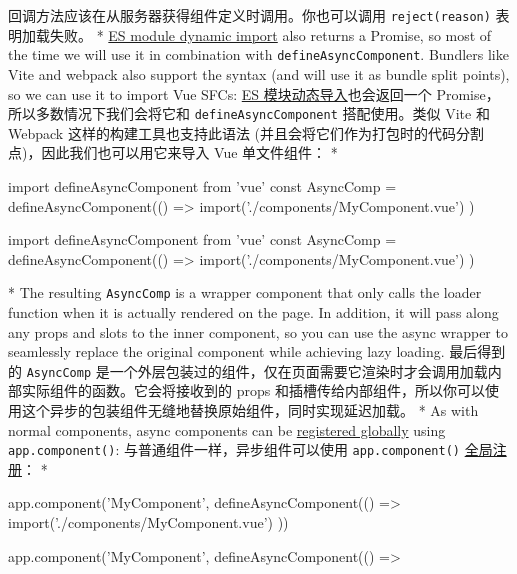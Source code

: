 \begin{paracol}{2}
回调方法应该在从服务器获得组件定义时调用。你也可以调用
\texttt{reject(reason)} 表明加载失败。
\switchcolumn[0]*%
\href{https://developer.mozilla.org/en-US/docs/Web/JavaScript/Reference/Operators/import}{ES
module dynamic import} also returns a Promise, so most of the time we
will use it in combination with \texttt{defineAsyncComponent}. Bundlers
like Vite and webpack also support the syntax (and will use it as bundle
split points), so we can use it to import Vue SFCs:
\switchcolumn
\href{https://developer.mozilla.org/en-US/docs/Web/JavaScript/Reference/Operators/import}{ES
模块动态导入}也会返回一个 Promise，所以多数情况下我们会将它和
\texttt{defineAsyncComponent} 搭配使用。类似 Vite 和 Webpack
这样的构建工具也支持此语法
(并且会将它们作为打包时的代码分割点)，因此我们也可以用它来导入 Vue
单文件组件：
\switchcolumn[0]*%
\begin{codeJs}
import { defineAsyncComponent } from 'vue'
const AsyncComp = defineAsyncComponent(() =>
  import('./components/MyComponent.vue')
)
\end{codeJs}
\switchcolumn
\begin{codeJs}
import { defineAsyncComponent } from 'vue'
const AsyncComp = defineAsyncComponent(() =>
  import('./components/MyComponent.vue')
)
\end{codeJs}
\switchcolumn[0]*%
The resulting \texttt{AsyncComp} is a wrapper component that only calls
the loader function when it is actually rendered on the page. In
addition, it will pass along any props and slots to the inner component,
so you can use the async wrapper to seamlessly replace the original
component while achieving lazy loading.
\switchcolumn
最后得到的 \texttt{AsyncComp}
是一个外层包装过的组件，仅在页面需要它渲染时才会调用加载内部实际组件的函数。它会将接收到的
props
和插槽传给内部组件，所以你可以使用这个异步的包装组件无缝地替换原始组件，同时实现延迟加载。
\switchcolumn[0]*%
As with normal components, async components can be
\href{https://vuejs.org/guide/components/registration.html\#global-registration}{registered
globally} using \texttt{app.component()}:
\switchcolumn
与普通组件一样，异步组件可以使用 \texttt{app.component()}
\href{https://cn.vuejs.org/guide/components/registration.html\#global-registration}{全局注册}：
\switchcolumn[0]*%
\begin{codeJs}
app.component('MyComponent', defineAsyncComponent(() =>
  import('./components/MyComponent.vue')
))
\end{codeJs}
\switchcolumn
\begin{codeJs}
app.component('MyComponent', defineAsyncComponent(() =>

\end{codeJs}
\end{paracol}
